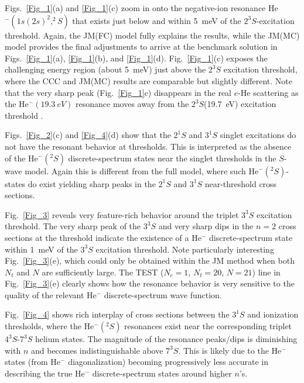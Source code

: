 \documentclass[aip
, pra
, showpacs
, aps
, twocolumn
, groupedaddress
, floatfix
]{revtex4}
\begin{document}
Figs.~\ref{Fig_1}(a) and \ref{Fig_1}(c) zoom in onto the negative-ion resonance He$^-(1s(2s)^2,^2S)$ that exists just 
below and within 5~meV of the $2^3S$-excitation threshold.
Again, the JM(FC) model fully explains the results, while the JM(MC) model provides the final adjustments to 
arrive at the benchmark solution in Figs.~\ref{Fig_1}(a), \ref{Fig_1}(b), and \ref{Fig_1}(d).
Fig.~\ref{Fig_1}(c) exposes the challenging energy region (about 5~meV) just above the $2^3S$ excitation threshold,
where the CCC and JM(MC) results are comparable but slightly different.
Note that the very sharp peak (Fig.~\ref{Fig_1}c) disappears in the real $e$-He scattering
\cite{KM95pL139, HBSBB96} as the He$^-(19.3~eV)$ resonance \cite{Schulz73, BC94, HY99}
moves away from the $2^3S$(19.7~eV) excitation threshold \cite{HBSBB96}.


Figs.~\ref{Fig_2}(c) and \ref{Fig_4}(d) show that the $2^1S$ and $3^1S$ singlet excitations 
do not have the resonant behavior at thresholds.
This is interpreted as the absence of 
the He$^-(^2S)$ discrete-spectrum states near the singlet thresholds in the $S$-wave model.
Again this is different from the full model, where such He$^-(^2S)$-states do exist yielding sharp
peaks in the $2^1S$ \cite{KM95pL139, HBSBB96} and $3^1S$ \cite{SMC2006} near-threshold cross sections.


Fig.~\ref{Fig_3} reveals very feature-rich  behavior around the triplet $3^3S$  excitation threshold.
The very sharp peak of the $3^3S$ and very sharp dips in the $n=2$ cross sections at the threshold indicate 
the existence of a He$^-$ discrete-spectrum state within 1~meV of the  $3^3S$  excitation threshold.
Note particularly interesting Fig.~\ref{Fig_3}(e), which could only be obtained within the JM method
when both $N_t$ and $N$ are sufficiently large.
The TEST ($N_c=1$, $N_t=20$, $N=21$) line in Fig.~\ref{Fig_3}(e) clearly shows how the resonance behavior
is very sensitive to the quality of the relevant He$^-$ discrete-spectrum wave function.


Fig.~\ref{Fig_4} shows  rich interplay of cross sections between the $3^1S$ and ionization thresholds,
where the He$^-(^2S)$ resonances exist near the corresponding triplet $4^3S$-$7^3S$ helium states.
The magnitude of the resonance peaks/dips is diminishing with $n$ and becomes indistinguishable above $7^3S$.
This is likely due to the He$^-$ states (from He$^-$ diagonalization)  
becoming progressively less accurate in describing the true He$^-$ discrete-spectrum states around higher $n$'s.
\end{document}
